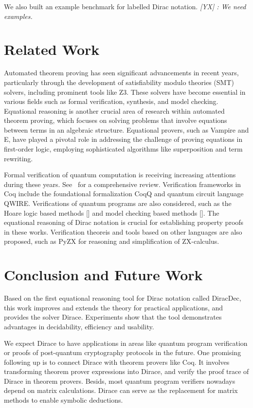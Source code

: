 \documentclass[runningheads]{llncs}
\newcommand{\yx}[1]{\textit{\color{blue}[YX] : #1}}
\begin{document}
We also built an example benchmark for labelled Dirac notation.
\yx{We need examples.}


\section{Related Work}

Automated theorem proving has seen significant advancements in recent years, particularly through the development of satisfiability modulo theories (SMT) solvers,
including prominent tools like Z3. These solvers have become essential in various fields such as formal verification, synthesis, and model checking. 
Equational reasoning is another crucial area of research within automated theorem proving, which focuses on solving problems that involve equations between terms in an algebraic structure. 
Equational provers, such as Vampire and E, have played a pivotal role in addressing the challenge of proving equations in first-order logic, employing sophisticated algorithms like superposition and term rewriting.

Formal verification of quantum computation is receiving increasing attentions during these years. See~\cite{Lewis2023} for a comprehensive review. 
Verification frameworks in Coq include the foundational formalization CoqQ and quantum circuit language QWIRE. 
Verifications of quantum programs are also considered, such as the Hoare logic based methods [] and model checking based methods [].
The equational reasoning of Dirac notation is crucial for establishing property proofs in these works.
Verification theoreis and tools based on other languages are also proposed, such as PyZX for reasoning and simplification of ZX-calculus.




\section{Conclusion and Future Work}
Based on the first equational reasoning tool for Dirac notation called DiracDec, this work improves and extends the theory for practical applications, and provides the solver Dirace. Experiments show that the tool demonstrates advantages in decidability, efficiency and usability. 

We expect Dirace to have applications in areas like quantum program verification or proofs of post-quantum cryptography protocols in the future.
One promising following up is to connect Dirace with theorem provers like Coq. It involves transforming theorem prover expressions into Dirace, and verify the proof trace of Dirace in theorem provers. Besids, most quantum program verifiers nowadays depend on matrix calculations. Dirace can serve as the replacement for matrix methods to enable symbolic deductions.
\end{document}
